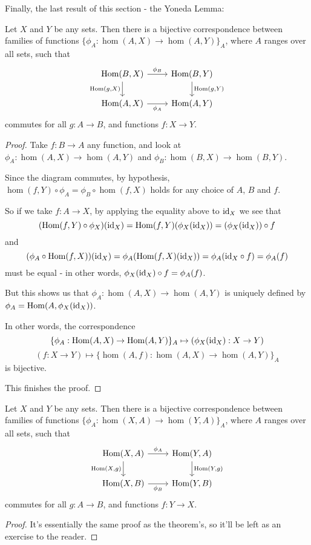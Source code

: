 Finally, the last result of this section - the Yoneda Lemma:

\begin{theorem}\label{thm:yoneda}
	Let $X$ and $Y$ be any sets. Then there is a bijective correspondence between families of functions $\{\phi_A:\hom(A,X)\to \hom(A,Y)\}_A$, where $A$ ranges over all sets, such that 
	\[\begin{tikzcd}
	{\hom(B,X)} \arrow[r, "\phi_B"] \arrow[d, "{\hom(g,X)}"'] & {\hom(B,Y)} \arrow[d, "{\hom(g,Y)}"] \\
	{\hom(A,X)} \arrow[r, "\phi_A"']                          & {\hom(A,Y)}                         
	\end{tikzcd}\]commutes for all $g:A\to B$, and functions $f:X\to Y$.
\end{theorem}
\begin{proof}
	Take $f:B\to A$ any function, and look at $\phi_A:\hom(A,X)\to\hom(A,Y)$ and $\phi_B:\hom(B,X)\to\hom(B,Y)$.
	
	Since the diagram commutes, by hypothesis, $\hom(f,Y)\circ\phi_A=\phi_B\circ\hom(f,X)$ holds for any choice of $A$, $B$ and $f$.
	
	So if we take $f:A\to X$, by applying the equality above to ${\rm id}_X$ we see that
	\[(\mathrm{Hom}(f,Y)\circ\phi_X)({\rm id}_X)=\mathrm{Hom}(f,Y)(\phi_X({\rm id}_X))=(\phi_X({\rm id}_X))\circ f\]and
	\[(\phi_A\circ\mathrm{Hom}(f,X))({\rm id}_X)=\phi_A(\mathrm{Hom}(f,X)({\rm id}_X))=\phi_A({\rm id}_X\circ f)=\phi_A(f)\]must be equal - in other words, $\phi_X({\rm id}_X)\circ f=\phi_A(f)$.
	
	But this shows us that $\phi_A:\hom(A,X)\to\hom(A,Y)$ is uniquely defined by $\phi_A=\mathrm{Hom}(A,\phi_X({\rm id}_X))$. 
	
	In other words, the correspondence
	\[\{\phi_A:\mathrm{Hom}(A,X)\to\mathrm{Hom}(A,Y)\}_A\mapsto (\phi_X({\rm id}_X):X\to Y)\]
	\[(f:X\to Y)\mapsto\{\hom(A,f):\hom(A,X)\to\hom(A,Y)\}_A\]is bijective.
	
	This finishes the proof.
\end{proof}
\begin{cor}
	Let $X$ and $Y$ be any sets. Then there is a bijective correspondence between families of functions $\{\phi_A:\hom(X,A)\to \hom(Y,A)\}_A$, where $A$ ranges over all sets, such that \[\begin{tikzcd}
	{\hom(X,A)} \arrow[r, "\phi_A"] \arrow[d, "{\hom(X,g)}"'] & {\hom(Y,A)} \arrow[d, "{\hom(Y,g)}"] \\
	{\hom(X,B)} \arrow[r, "\phi_B"']                          & {\hom(Y,B)}                         
	\end{tikzcd}\]commutes for all $g:A\to B$, and functions $f:Y\to X$.
\end{cor}
\begin{proof}
	It's essentially the same proof as the theorem's, so it'll be left as an exercise to the reader.
\end{proof}

